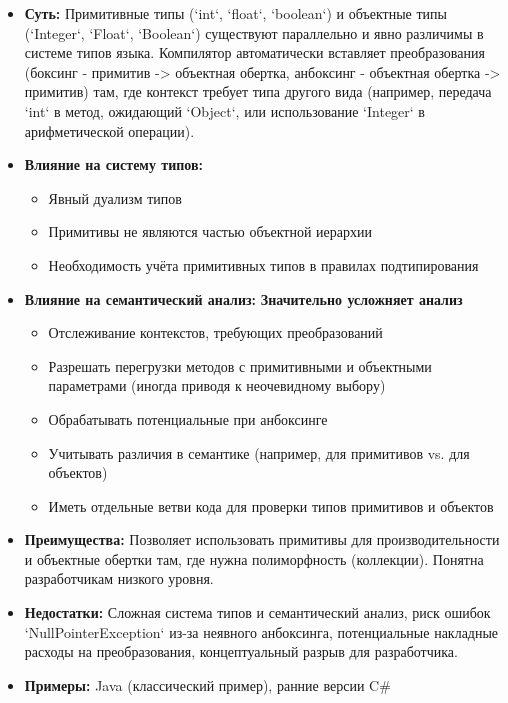 \begin{itemize}[label={--}]
    \item \textbf{Суть:} Примитивные типы (`int`, `float`, `boolean`) и объектные типы (`Integer`, `Float`, `Boolean`) существуют параллельно и явно различимы в системе типов языка. Компилятор автоматически вставляет преобразования (боксинг - примитив -> объектная обертка, анбоксинг - объектная обертка -> примитив) там, где контекст требует типа другого вида (например, передача `int` в метод, ожидающий `Object`, или использование `Integer` в арифметической операции).

    \item \textbf{Влияние на систему типов:}
    \begin{itemize}
        \item Явный дуализм типов
        \item Примитивы не являются частью объектной иерархии
        \item Необходимость учёта примитивных типов в правилах подтипирования
    \end{itemize}

    \item \textbf{Влияние на семантический анализ:}
    \textbf{Значительно усложняет анализ}
    \begin{itemize}[label={--}]
        \item Отслеживание контекстов, требующих преобразований
        \item Разрешать перегрузки методов с примитивными и объектными параметрами (иногда приводя к неочевидному выбору)
        \item Обрабатывать потенциальные  при анбоксинге 
        \item Учитывать различия в семантике (например,  \code{==} для примитивов vs. для объектов)
        \item Иметь отдельные ветви кода для проверки типов примитивов и объектов
    \end{itemize}

    \item \textbf{Преимущества:}
    Позволяет использовать примитивы для производительности и объектные обертки там, где нужна полиморфность (коллекции). Понятна разработчикам низкого уровня.

    \item \textbf{Недостатки:} Сложная система типов и семантический анализ, риск ошибок `NullPointerException` из-за неявного анбоксинга, потенциальные накладные расходы на преобразования, концептуальный разрыв для разработчика.

    \item \textbf{Примеры:} Java (классический пример), ранние версии C\#
\end{itemize}

